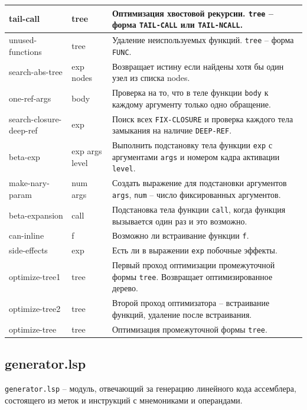 \begin{xltabular}{\textwidth}{|p{2.5cm}|p{2.5cm}|X|}
	tail-call & tree & Оптимизация хвостовой рекурсии. \texttt{tree} -- форма \texttt{TAIL-CALL} или \texttt{TAIL-NCALL}. \\ \hline
	unused-functions & tree & Удаление неиспользуемых функций. \texttt{tree} -- форма \texttt{FUNC}. \\ \hline
	search-abs-tree & exp nodes & Возвращает истину если найдены хотя бы один узел из списка nodes. \\ \hline
	one-ref-args & body & Проверка на то, что в теле функции \texttt{body} к каждому аргументу только одно обращение. \\ \hline
	search-closure-deep-ref & exp & Поиск всех \texttt{FIX-CLOSURE} и проверка каждого тела замыкания на наличие \texttt{DEEP-REF}. \\ \hline
	beta-exp & exp args level & Выполнить подстановку тела функции \texttt{exp} с аргументами \texttt{args} и номером кадра активации \texttt{level}. \\ \hline
	make-nary-param & num args & Создать выражение для подстановки аргументов \texttt{args}, \texttt{num} -- число фиксированных аргументов. \\ \hline
	beta-expansion & call & Подстановка тела функции \texttt{call}, когда функция вызывается один раз и это возможно. \\ \hline
	can-inline & f & Возможно ли встраивание функции \texttt{f}. \\ \hline
	side-effects & exp & Есть ли в выражении \texttt{exp} побочные эффекты. \\ \hline
	optimize-tree1 & tree & Первый проход оптимизации промежуточной формы \texttt{tree}. Возвращает оптимизированное дерево. \\ \hline
	optimize-tree2 & tree & Второй проход оптимизатора -- встраивание функций, удаление после встраивания. \\ \hline
	optimize-tree & tree & Оптимизация промежуточной формы \texttt{tree}. \\ \hline
\end{xltabular}
\renewcommand{\arraystretch}{1.0} %


\subsection{generator.lsp}

\texttt{generator.lsp} -- модуль, отвечающий за генерацию линейного кода ассемблера, состоящего из меток и инструкций с мнемониками и операндами.

